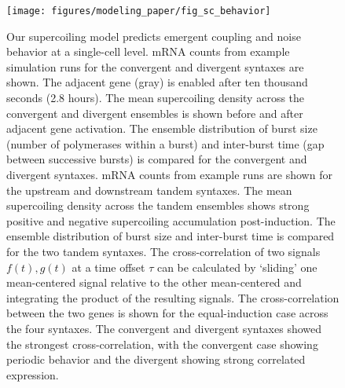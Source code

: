 \documentclass[11pt]{article}
\begin{document}
\begin{figure}[htbp]
    \centering
    {\texttt{[image: figures/modeling\_paper/fig\_sc\_behavior]}
    \label{fig:sc_examples_convergent_divergent}
    \label{fig:sc_density_convergent_divergent}
    \label{fig:burst_dynamics_convergent_divergent}
    \label{fig:sc_examples_tandem}
    \label{fig:sc_density_tandem}
    \label{fig:burst_dynamics_tandem}
    \label{fig:cross_correlation_cartoon}
    \label{fig:orientation_cross_correlation}
    \label{fig:output_distribution_by_orientation_dynamics}
    \label{fig:noise_by_orientation}
    }
\end{figure}
\begin{figure}[htbp]
    \ContinuedFloat
    \caption{Our supercoiling model predicts emergent coupling and noise behavior at a single-cell level.
         mRNA counts from example simulation runs for the convergent and divergent syntaxes are shown. The adjacent gene (gray) is enabled after ten thousand seconds (2.8 hours).%
         The mean supercoiling density across the convergent and divergent ensembles is shown before and after adjacent gene activation.
         The ensemble distribution of burst size (number of polymerases within a burst) and inter-burst time (gap between successive bursts) is compared for the convergent and divergent syntaxes.
         mRNA counts from example runs are shown for the upstream and downstream tandem syntaxes.
         The mean supercoiling density across the tandem ensembles shows strong positive and negative supercoiling accumulation post-induction. %
         The ensemble distribution of burst size and inter-burst time is compared for the two tandem syntaxes.
         The cross-correlation of two signals \(f(t), g(t)\) at a time offset \(\tau\) can be calculated by `sliding' one mean-centered signal relative to the other mean-centered and integrating the product of the resulting signals.
         The cross-correlation between the two genes is shown for the equal-induction case across the four syntaxes. The convergent and divergent syntaxes showed the strongest cross-correlation, with the convergent case showing periodic behavior and the divergent showing strong correlated expression.
}
\end{figure}
\end{document}

